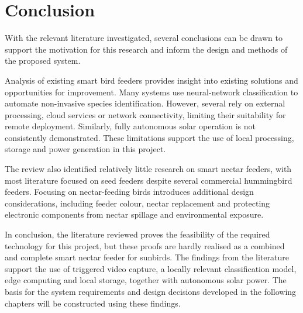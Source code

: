 \section{Conclusion}

With the relevant literature investigated, several conclusions can be drawn to support the motivation for this research and inform the design and methods of the proposed system.
\par\vspace{6pt}
Analysis of existing smart bird feeders provides insight into existing solutions and opportunities for improvement. Many systems use neural-network classification to automate non-invasive species identification. However, several rely on external processing, cloud services or network connectivity, limiting their suitability for remote deployment. Similarly, fully autonomous solar operation is not consistently demonstrated. These limitations support the use of local processing, storage and power generation in this project.
\par\vspace{6pt}
The review also identified relatively little research on smart nectar feeders, with most literature focused on seed feeders despite several commercial hummingbird feeders. Focusing on nectar-feeding birds introduces additional design considerations, including feeder colour, nectar replacement and protecting electronic components from nectar spillage and environmental exposure.
\par\vspace{6pt}
In conclusion, the literature reviewed proves the feasibility of the required technology for this project, but these proofs are hardly realised as a combined and complete smart nectar feeder for sunbirds. The findings from the literature support the use of triggered video capture, a locally relevant classification model, edge computing and local storage, together with autonomous solar power.
The basis for the system requirements and design decisions developed in the following chapters will be constructed using these findings.